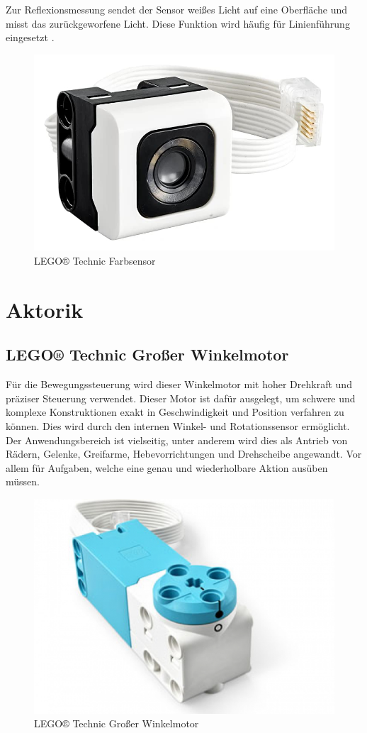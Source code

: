Zur Reflexionsmessung sendet der Sensor weißes Licht auf eine Oberfläche und misst das zurückgeworfene Licht. Diese Funktion wird häufig für Linienführung eingesetzt \autocite{betzold2025colorsensor}\autocite{lego2020colorsensor}.

\begin{figure}[H]
	\centering
	\includegraphics[width=0.4\linewidth]{images/Farbsensor}
	\caption{LEGO® Technic Farbsensor}
	\label{fig:farbsensor}
\end{figure}


\section{Aktorik} %
\subsection{LEGO® Technic Großer Winkelmotor}
Für die Bewegungssteuerung wird dieser Winkelmotor mit hoher Drehkraft und präziser Steuerung verwendet. Dieser Motor ist dafür ausgelegt, um schwere und komplexe Konstruktionen exakt in Geschwindigkeit und Position verfahren zu können. Dies wird durch den internen Winkel- und Rotationssensor ermöglicht. Der Anwendungsbereich ist vielseitig, unter anderem wird dies als Antrieb von Rädern, Gelenke, Greifarme, Hebevorrichtungen und Drehscheibe angewandt. Vor allem für Aufgaben, welche eine genau und wiederholbare Aktion ausüben müssen.

\begin{figure}[H]
	\centering
	\includegraphics[width=0.4\linewidth]{images/Motor}
	\caption{LEGO® Technic Großer Winkelmotor}
	\label{fig:motor}
\end{figure}
